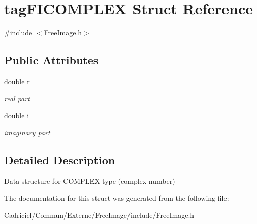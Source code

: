 \hypertarget{structtag_f_i_c_o_m_p_l_e_x}{\section{tag\-F\-I\-C\-O\-M\-P\-L\-E\-X Struct Reference}
\label{structtag_f_i_c_o_m_p_l_e_x}
}


{\ttfamily \#include $<$Free\-Image.\-h$>$}

\subsection*{Public Attributes}
\begin{DoxyCompactItemize}
\item 
\hypertarget{structtag_f_i_c_o_m_p_l_e_x_a448818f3de56c81064bdcb1ba78a7ead}{double \hyperlink{structtag_f_i_c_o_m_p_l_e_x_a448818f3de56c81064bdcb1ba78a7ead}{r}}\label{structtag_f_i_c_o_m_p_l_e_x_a448818f3de56c81064bdcb1ba78a7ead}

\begin{DoxyCompactList}\small\item\em real part \end{DoxyCompactList}\item 
\hypertarget{structtag_f_i_c_o_m_p_l_e_x_ad2cc2cc6d32c1e5496f2c77e185d8218}{double \hyperlink{structtag_f_i_c_o_m_p_l_e_x_ad2cc2cc6d32c1e5496f2c77e185d8218}{i}}\label{structtag_f_i_c_o_m_p_l_e_x_ad2cc2cc6d32c1e5496f2c77e185d8218}

\begin{DoxyCompactList}\small\item\em imaginary part \end{DoxyCompactList}\end{DoxyCompactItemize}


\subsection{Detailed Description}
Data structure for C\-O\-M\-P\-L\-E\-X type (complex number) 

The documentation for this struct was generated from the following file\-:\begin{DoxyCompactItemize}
\item 
Cadriciel/\-Commun/\-Externe/\-Free\-Image/include/Free\-Image.\-h\end{DoxyCompactItemize}
